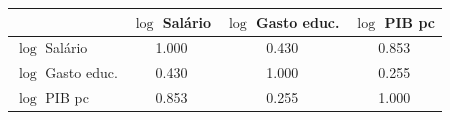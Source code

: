 \begin{tabular}{lccc}
\toprule
 & $\log$ Salário & $\log$ Gasto educ. & $\log$ PIB pc \\
\midrule
$\log$ Salário & 1.000 & 0.430 & 0.853 \\
$\log$ Gasto educ. & 0.430 & 1.000 & 0.255 \\
$\log$ PIB pc & 0.853 & 0.255 & 1.000 \\
\bottomrule
\end{tabular}
